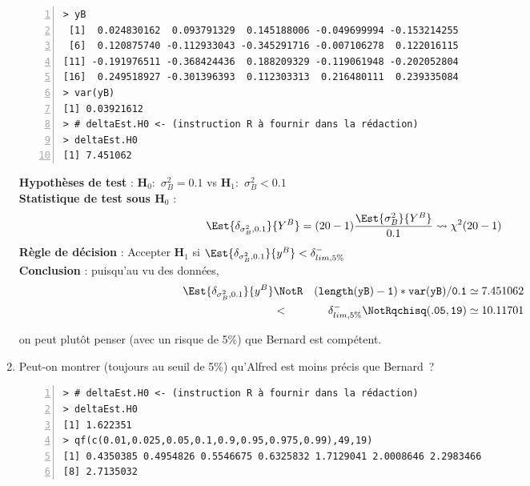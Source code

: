 \documentclass[10pt]{report}
\begin{document}
\begin{exercice}
\begin{enumerate}
\IndicR
\begin{Verbatim}[frame=leftline,fontfamily=tt,fontshape=n,numbers=left]
> yB
 [1]  0.024830162  0.093791329  0.145188006 -0.049699994 -0.153214255
 [6]  0.120875740 -0.112933043 -0.345291716 -0.007106278  0.122016115
[11] -0.191976511 -0.368424436  0.188209329 -0.119061948 -0.202052804
[16]  0.249518927 -0.301396393  0.112303313  0.216480111  0.239335084
> var(yB)
[1] 0.03921612
> # deltaEst.H0 <- (instruction R à fournir dans la rédaction)
> deltaEst.H0
[1] 7.451062
\end{Verbatim}



\begin{Correction}

\noindent \textbf{Hypothèses de test} : $\mathbf{H}_0:$ $\sigma^2_{B}=0.1$ vs {\large $\mathbf{H}_1:$ $\sigma^2_{B}<0.1$}\\
\textbf{Statistique de test sous $\mathbf{H}_0$} :
  $$
  \Est{\delta_{\sigma^2_{B},0.1}}{Y^{B}}= {\displaystyle (20-1)\frac{\Est{\sigma^2_{B}}{Y^{B}}}{0.1}} 
  \leadsto \chi^2(20-1)
  $$
\textbf{Règle de décision} : Accepter $\mathbf{H}_1$ si 
  $\Est{\delta_{\sigma^2_{B},0.1}}{y^{B}} < \delta^-_{lim,5\%}$\\
\noindent \textbf{Conclusion} :
puisqu'au vu des données, 
  \begin{eqnarray*}
\Est{\delta_{\sigma^2_{B},0.1}}{y^{B}} &\NotR&\mathtt{(length(yB)-1)*var(yB)/0.1}\simeq 7.451062\\& <  & \delta^-_{lim,5\%} \NotR \mathtt{qchisq(.05,19)}\simeq10.11701
\end{eqnarray*}
  
on peut plutôt penser (avec un risque de 5\%) que Bernard est compétent.
\end{Correction}


\item Peut-on montrer (toujours au seuil de 5\%) qu'Alfred est moins précis que Bernard~?


\IndicR
\begin{Verbatim}[frame=leftline,fontfamily=tt,fontshape=n,numbers=left]
> # deltaEst.H0 <- (instruction R à fournir dans la rédaction)
> deltaEst.H0
[1] 1.622351
> qf(c(0.01,0.025,0.05,0.1,0.9,0.95,0.975,0.99),49,19)
[1] 0.4350385 0.4954826 0.5546675 0.6325832 1.7129041 2.0008646 2.2983466
[8] 2.7135032
\end{Verbatim}




\end{enumerate}
\end{exercice}
\end{document}
